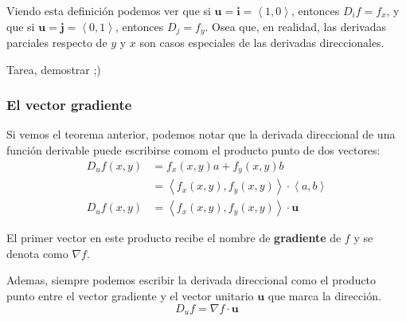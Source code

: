 \documentclass[12pt]{article}
\begin{document}
Viendo esta definición podemos ver que si $ \mathbf{u}=\mathbf{i}=\left\langle 1,0 \right\rangle $, entonces $ D_{i}f=f_{x} $, y que si $ \mathbf{u}=\mathbf{j}=\left\langle 0,1 \right\rangle $, entonces $ D_{j}=f_{y} $. Osea que, en realidad, las derivadas parciales respecto de $ y $ y $ x $ son casos especiales de las derivadas direccionales.

\vspace{0.2cm}
\vspace{0.2cm}

Tarea, demostrar ;)

\subsubsection{El vector gradiente}
Si vemos el teorema anterior, podemos notar que la derivada direccional de una función derivable puede escribirse comom el producto punto de dos vectores:
\begin{align*}
  D_{u}f(x,y) &= f_{x}(x,y)a+f_{y}(x,y)b\\
   &= \left\langle f_{x}(x,y),f_{y}(x,y) \right\rangle\cdot \left\langle a,b \right\rangle\\
  D_{u}f(x,y) &= \left\langle f_{x}(x,y),f_{y}(x,y) \right\rangle\cdot \mathbf{u}
\end{align*}

El primer vector en este producto recibe el nombre de \textbf{gradiente} de $ f $ y se denota como $ \nabla f $.

\vspace{0.2cm}
\vspace{0.2cm}

Ademas, siempre podemos escribir la derivada direccional como el producto punto entre el vector gradiente y el vector unitario $ \mathbf{u} $ que marca la dirección.
\[
D_{u}f = \nabla f \cdot \mathbf{u}
\]
\end{document}
